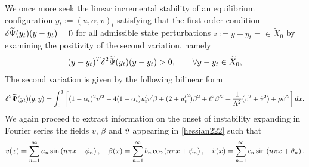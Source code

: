 \documentclass[10pt]{article}
\begin{document}
We once more seek the linear incremental stability of an equilibrium configuration $y_t := (u, \alpha,  v)_t$ satisfying that the first order condition $\delta \widetilde\Psi(y_t)(y-y_t)=0$ for all admissible state perturbations $z:=y-y_t=\in\widetilde X_0$ by examining the positivity of the second variation, namely
\begin{equation*}
    (y-y_t)^T\delta^2 \widetilde\Psi(y_t)(y-y_t)>0, \qquad \forall y-y_t\in \widetilde X_0,
\end{equation*}The second variation is given by the following bilinear form 
\begin{equation}
\delta^2 \Ecompl(y_t)(y, y)=\int_0^1 \left[(1-\alpha_t)^2v'^2 
%
- 4(1-\alpha_t)u_t' v'\beta+(2+ {u_t'}^2)\beta^2+\damagell^2\beta'^2 +\frac{1}{\elastell^2}( v^2 + \subsutest^2)+\stiffratio \subsutest'^2\right]dx.\label{hessian222}\end{equation}
We again proceed to extract information on the onset of instability expanding in Fourier series the fields $v$, $\beta$ and $\tilde v$ appearing in \eqref{hessian222} such that 
\[
v(x) = \sum_{n=1}^{\infty} a_{n} \sin \left(n \pi x + \phi_{n}\right),
\quad \beta(x) = \sum_{n=1}^{\infty} b_{n} \cos \left(n \pi x + \psi_{n}\right),
\quad \tilde v(x) = \sum_{n=1}^{\infty} c_{n} \sin \left(n \pi x + \theta_{n}\right).
\]
\end{document}
